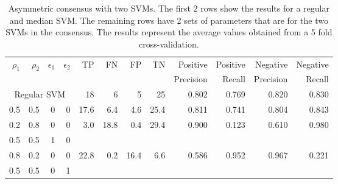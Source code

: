 \documentclass[twoside,11pt]{article}
\begin{document}
\begin{table}[htbp]\label{table:HeartDisease2}
  \centering
    \begin{tabular}{rrrr|rrrrrrrr}
    \hline
    \multirow{2}{*}{$\rho_1$} & \multirow{2}{*}{$\rho_2$} & \multirow{2}{*}{$\epsilon_1$} & \multirow{2}{*}{$\epsilon_2$} & \multirow{2}{*}{TP}    & \multirow{2}{*}{FN}    & \multirow{2}{*}{FP}    & \multirow{2}{*}{TN} & Positive & Positive & Negative & Negative\\
    &&&&&&&&  Precision &  Recall &  Precision &  Recall \bigstrut\\
    \hline
    \hline
   \multicolumn{4}{c|}{Regular SVM} & 18    & 6     & 5     & 25    & 0.802 & 0.769 & 0.820 & 0.830 \bigstrut\\
    \hline
    0.5   & 0.5   & 0     & 0     & 17.6  & 6.4   & 4.6   & 25.4  & 0.811 & 0.741 & 0.804 & 0.843 \bigstrut\\
    \hline
    0.2   & 0.8   & 0     & 0     & 3.0   & 18.8  & 0.4   & 29.4  & 0.900 & 0.123 & 0.610 & 0.980 \bigstrut[t]\\
    0.5   & 0.5   & 1     & 0     &       &       &       &       &       &       &       &  \bigstrut[b]\\
    \hline
    0.8   & 0.2   & 0     & 0     & 22.8  & 0.2   & 16.4  & 6.6   & 0.586 & 0.952 & 0.967 & 0.221 \bigstrut[t]\\
    0.5   & 0.5   & 0     & 1     &       &       &       &       &       &       &       &  \bigstrut[b]\\
    \hline
    \hline
    \end{tabular}%
    \caption{Asymmetric consensus with two SVMs. The first 2 rows show the results for a regular and median SVM. The remaining rows have 2 sets of parameters that are for the two SVMs in the consensus. The results represent the average values obtained from a 5 fold cross-validation.}
\end{table}%
\end{document}
